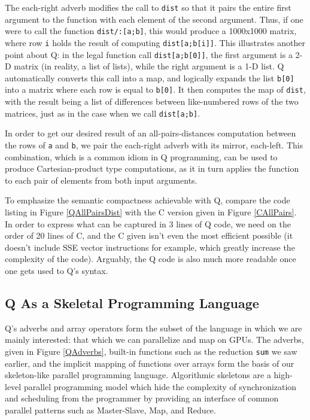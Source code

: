 \documentclass[preprint]{sigplanconf}
\begin{document}
The each-right adverb modifies the call to \texttt{dist} so that it pairs the entire first argument to the function with each element of the second argument.  Thus, if one were to call the function \texttt{dist/:[a;b]}, this would produce a 1000x1000 matrix, where row \texttt{i} holds the result of computing \texttt{dist[a;b[i]]}.  This illustrates another point about Q: in the legal function call \texttt{dist[a;b[0]]}, the first argument is a 2-D matrix (in reality, a list of lists), while the right argument is a 1-D list.  Q automatically converts this call into a map, and logically expands the list \texttt{b[0]} into a matrix where each row is equal to \texttt{b[0]}.  It then computes the map of \texttt{dist}, with the result being a list of differences between like-numbered rows of the two matrices, just as in the case when we call \texttt{dist[a;b]}.

In order to get our desired result of an all-pairs-distances computation between the rows of \texttt{a} and \texttt{b}, we pair the each-right adverb with its mirror, each-left.  This combination, which is a common idiom in Q programming, can be used to produce Cartesian-product type computations, as it in turn applies the function to each pair of elements from both input arguments.

To emphasize the semantic compactness achievable with Q, compare the code listing in Figure \ref{QAllPairsDist} with the C version given in Figure \ref{CAllPairs}.  In order to express what can be captured in 3 lines of Q code, we need on the order of 20 lines of C, and the C given isn't even the most efficient possible (it doesn't include SSE vector instructions for example, which greatly increase the complexity of the code).  Arguably, the Q code is also much more readable once one gets used to Q's syntax.

\subsection{Q As a Skeletal Programming Language}
Q's adverbs and array operators form the subset of the language in which we are mainly interested: that which we can parallelize and map on GPUs.  The adverbs, given in Figure \ref{QAdverbs}, built-in functions such as the reduction \texttt{sum} we saw earlier, and the implicit mapping of functions over arrays form the basis of our skeleton-like parallel programming language.  Algorithmic skeletons \cite{Cole04} are a high-level parallel programming model which hide the complexity of synchronization and scheduling from the programmer by providing an interface of common parallel patterns such as Master-Slave, Map, and Reduce.
\end{document}
